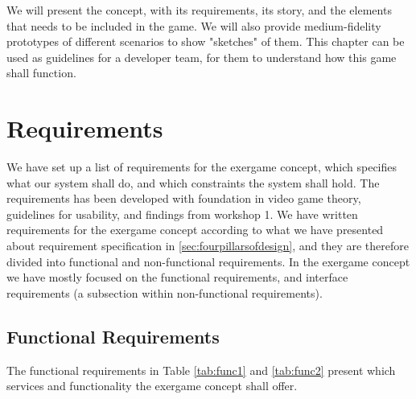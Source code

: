 We will present the concept, with its requirements, its story, and the elements that needs to be included in the game. We will also provide medium-fidelity prototypes of different scenarios to show "sketches" of them.  This chapter can be used as guidelines for a developer team, for them to understand how this game shall function. 

\section{Requirements}
\label{sec:req}
We have set up a list of requirements for the exergame concept, which specifies what our system shall do, and which constraints the system shall hold. The requirements has been developed with foundation in video game theory, guidelines for usability, and findings from workshop 1. We have written requirements for the exergame concept according to what we have presented about requirement specification in \ref{sec:fourpillarsofdesign}, and they are therefore divided into functional and non-functional requirements. In the exergame concept we have mostly focused on the functional requirements, and interface requirements (a subsection within non-functional requirements). 

\subsection{Functional Requirements}
The functional requirements in Table \ref{tab:func1} and \ref{tab:func2} present which services and functionality the exergame concept shall offer.

